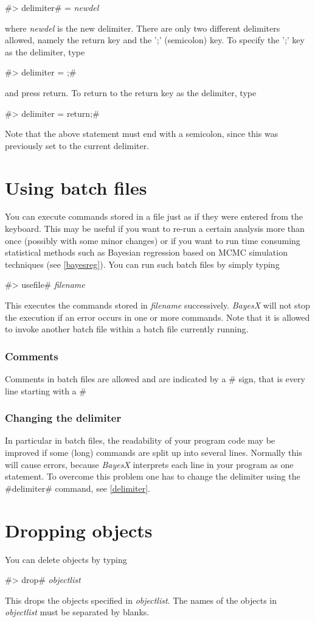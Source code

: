 #> delimiter# = {\em newdel}

where {\em newdel} is the new delimiter. There are only two
different delimiters allowed, namely the
return key and the ';' (semicolon) key. To specify the ';' key as the delimiter, type

#> delimiter = ;#

and press return. To return to the return key as the delimiter, type

#> delimiter = return;#

Note that the above statement must end with a semicolon, since
this was previously set to the current delimiter.


\section{Using batch files}
\label{batch} 

You can execute commands stored in a file just as if they were
entered from the keyboard. This may be useful if you want to
re-run a certain analysis more than once (possibly with some minor
changes) or if you want to run time consuming statistical methods
such as Bayesian regression based on MCMC simulation techniques
(see \autoref{bayesreg}).
You can run such batch files by simply typing

#> usefile# {\em filename}

This executes the commands stored in {\em filename} successively.
{\em BayesX} will not stop the execution if an error occurs in one
or more commands. Note that it is allowed to invoke
another batch file within a batch file currently running.


\subsubsection*{Comments}

Comments in batch files are allowed and are indicated by a  #%
sign, that is every line
starting with a #%

\subsubsection*{Changing the delimiter}

In particular in batch files, the readability of your program code
may be improved if some (long) commands are split up into several
lines. Normally this will cause errors, because {\em BayesX}
interprets each line in your program as one statement. To overcome
this problem one has to change the delimiter using the #delimiter#
command, see \autoref{delimiter}.


\section{Dropping objects}
 

You can delete objects by typing

#> drop# {\em objectlist}

This drops the objects specified in {\em objectlist}. The names of
the objects in {\em objectlist} must be separated by blanks.
